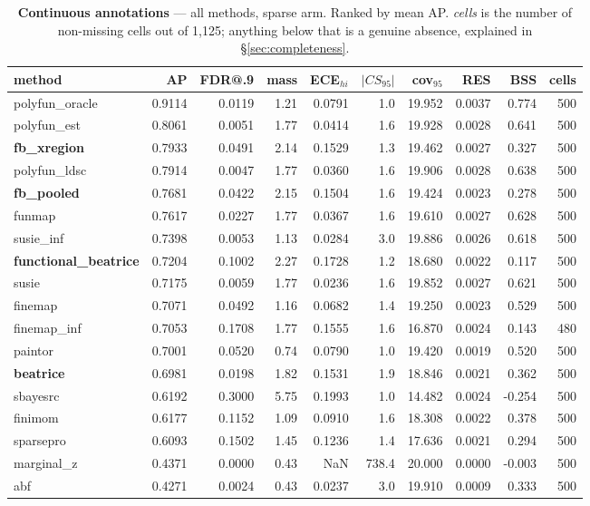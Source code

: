 \begin{table}[htbp]\centering\small
\caption{\textbf{Continuous annotations} --- all methods, sparse arm. Ranked by mean AP. \emph{cells} is the number of non-missing cells out of 1{,}125; anything below that is a genuine absence, explained in \S\ref{sec:completeness}.}
\label{tab:main-continuous}
\begin{tabular}{lrrrrrrrr r}\toprule
method & AP & FDR@.9 & mass & ECE$_{hi}$ & $|CS_{95}|$ & cov$_{95}$ & RES & BSS & cells\\\midrule
polyfun\_oracle & 0.9114 & 0.0119 & 1.21 & 0.0791 & 1.0 & 19.952 & 0.0037 & 0.774 & 500\\
polyfun\_est & 0.8061 & 0.0051 & 1.77 & 0.0414 & 1.6 & 19.928 & 0.0028 & 0.641 & 500\\
\textbf{fb\_xregion} & 0.7933 & 0.0491 & 2.14 & 0.1529 & 1.3 & 19.462 & 0.0027 & 0.327 & 500\\
polyfun\_ldsc & 0.7914 & 0.0047 & 1.77 & 0.0360 & 1.6 & 19.906 & 0.0028 & 0.638 & 500\\
\textbf{fb\_pooled} & 0.7681 & 0.0422 & 2.15 & 0.1504 & 1.6 & 19.424 & 0.0023 & 0.278 & 500\\
funmap & 0.7617 & 0.0227 & 1.77 & 0.0367 & 1.6 & 19.610 & 0.0027 & 0.628 & 500\\
susie\_inf & 0.7398 & 0.0053 & 1.13 & 0.0284 & 3.0 & 19.886 & 0.0026 & 0.618 & 500\\
\textbf{functional\_beatrice} & 0.7204 & 0.1002 & 2.27 & 0.1728 & 1.2 & 18.680 & 0.0022 & 0.117 & 500\\
susie & 0.7175 & 0.0059 & 1.77 & 0.0236 & 1.6 & 19.852 & 0.0027 & 0.621 & 500\\
finemap & 0.7071 & 0.0492 & 1.16 & 0.0682 & 1.4 & 19.250 & 0.0023 & 0.529 & 500\\
finemap\_inf & 0.7053 & 0.1708 & 1.77 & 0.1555 & 1.6 & 16.870 & 0.0024 & 0.143 & 480\\
paintor & 0.7001 & 0.0520 & 0.74 & 0.0790 & 1.0 & 19.420 & 0.0019 & 0.520 & 500\\
\textbf{beatrice} & 0.6981 & 0.0198 & 1.82 & 0.1531 & 1.9 & 18.846 & 0.0021 & 0.362 & 500\\
sbayesrc & 0.6192 & 0.3000 & 5.75 & 0.1993 & 1.0 & 14.482 & 0.0024 & -0.254 & 500\\
finimom & 0.6177 & 0.1152 & 1.09 & 0.0910 & 1.6 & 18.308 & 0.0022 & 0.378 & 500\\
sparsepro & 0.6093 & 0.1502 & 1.45 & 0.1236 & 1.4 & 17.636 & 0.0021 & 0.294 & 500\\
marginal\_z & 0.4371 & 0.0000 & 0.43 & NaN & 738.4 & 20.000 & 0.0000 & -0.003 & 500\\
abf & 0.4271 & 0.0024 & 0.43 & 0.0237 & 3.0 & 19.910 & 0.0009 & 0.333 & 500\\
\bottomrule\end{tabular}\end{table}
